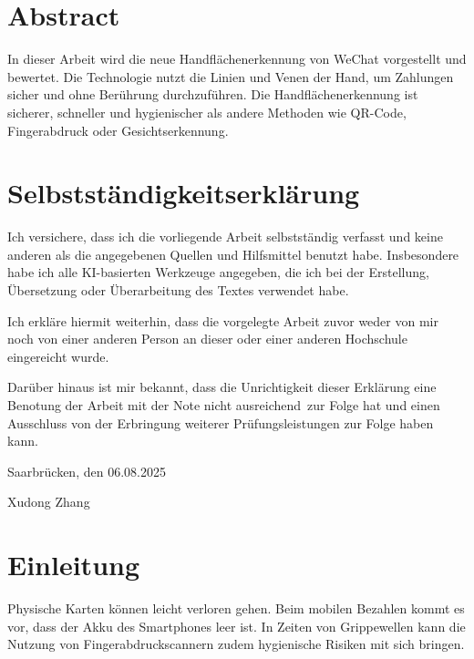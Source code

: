 \documentclass[paper=a4,fontsize=12pt,ngerman]{scrartcl}
\begin{document}
\pagestyle{plain}



\section*{Abstract}
In dieser Arbeit wird die neue Handflächenerkennung von WeChat vorgestellt und bewertet. Die Technologie nutzt die Linien und Venen der Hand, um Zahlungen sicher und ohne Berührung durchzuführen. Die Handflächenerkennung ist sicherer, schneller und hygienischer als andere Methoden wie QR-Code, Fingerabdruck oder Gesichtserkennung.


\newpage
\section*{Selbstständigkeitserklärung}
Ich versichere, dass ich die vorliegende Arbeit selbstständig verfasst und 
keine anderen als die angegebenen Quellen und Hilfsmittel benutzt habe.
Insbesondere habe ich alle KI-basierten Werkzeuge angegeben, die ich bei
der Erstellung, Übersetzung oder Überarbeitung des Textes verwendet habe.

Ich erkläre hiermit weiterhin, dass die vorgelegte Arbeit zuvor weder von mir 
noch von einer anderen Person an dieser oder einer anderen Hochschule 
eingereicht wurde.

Darüber hinaus ist mir bekannt, dass die Unrichtigkeit dieser Erklärung eine 
Benotung der Arbeit mit der Note \glqq nicht ausreichend\grqq \ zur Folge hat 
und einen Ausschluss von der Erbringung weiterer Prüfungsleistungen zur Folge 
haben kann.
\bigskip
 
Saarbrücken, den 06.08.2025

\smallskip
Xudong Zhang




\clearpage
\tableofcontents 

\clearpage
{}


\section{Einleitung}
Physische Karten können leicht verloren gehen. Beim mobilen Bezahlen kommt es vor, dass der Akku des Smartphones leer ist. In Zeiten von Grippewellen kann die Nutzung von Fingerabdruckscannern zudem hygienische Risiken mit sich bringen.\cite{tencent2024article}
\end{document}
